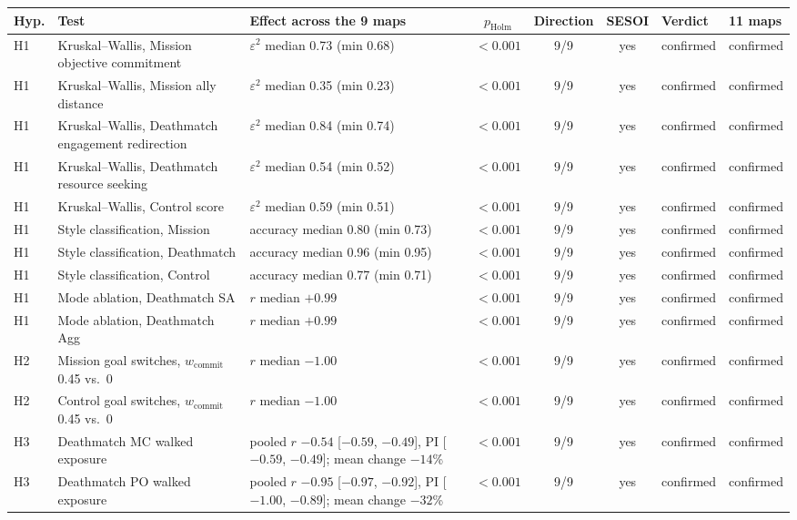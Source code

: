 \begin{tabular}{llp{}cccll}
\toprule
Hyp. & Test & Effect across the 9 maps & $p_{\mathrm{Holm}}$ & Direction & SESOI & Verdict & 11 maps \\
\midrule
H1 & Kruskal--Wallis, Mission objective commitment & $\varepsilon^2$ median 0.73 (min 0.68) & $<0.001$ & 9/9 & yes & confirmed & confirmed \\
H1 & Kruskal--Wallis, Mission ally distance & $\varepsilon^2$ median 0.35 (min 0.23) & $<0.001$ & 9/9 & yes & confirmed & confirmed \\
H1 & Kruskal--Wallis, Deathmatch engagement redirection & $\varepsilon^2$ median 0.84 (min 0.74) & $<0.001$ & 9/9 & yes & confirmed & confirmed \\
H1 & Kruskal--Wallis, Deathmatch resource seeking & $\varepsilon^2$ median 0.54 (min 0.52) & $<0.001$ & 9/9 & yes & confirmed & confirmed \\
H1 & Kruskal--Wallis, Control score & $\varepsilon^2$ median 0.59 (min 0.51) & $<0.001$ & 9/9 & yes & confirmed & confirmed \\
H1 & Style classification, Mission & accuracy median 0.80 (min 0.73) & $<0.001$ & 9/9 & yes & confirmed & confirmed \\
H1 & Style classification, Deathmatch & accuracy median 0.96 (min 0.95) & $<0.001$ & 9/9 & yes & confirmed & confirmed \\
H1 & Style classification, Control & accuracy median 0.77 (min 0.71) & $<0.001$ & 9/9 & yes & confirmed & confirmed \\
H1 & Mode ablation, Deathmatch SA & $r$ median $+0.99$ & $<0.001$ & 9/9 & yes & confirmed & confirmed \\
H1 & Mode ablation, Deathmatch Agg & $r$ median $+0.99$ & $<0.001$ & 9/9 & yes & confirmed & confirmed \\
\midrule
H2 & Mission goal switches, $w_{\mathrm{commit}}$ 0.45 vs.\ 0 & $r$ median $-1.00$ & $<0.001$ & 9/9 & yes & confirmed & confirmed \\
H2 & Control goal switches, $w_{\mathrm{commit}}$ 0.45 vs.\ 0 & $r$ median $-1.00$ & $<0.001$ & 9/9 & yes & confirmed & confirmed \\
\midrule
H3 & Deathmatch MC walked exposure & pooled $r$ $-0.54$ [$-0.59$, $-0.49$], PI [$-0.59$, $-0.49$]; mean change $-14$\% & $<0.001$ & 9/9 & yes & confirmed & confirmed \\
H3 & Deathmatch PO walked exposure & pooled $r$ $-0.95$ [$-0.97$, $-0.92$], PI [$-1.00$, $-0.89$]; mean change $-32$\% & $<0.001$ & 9/9 & yes & confirmed & confirmed \\

\end{tabular}
